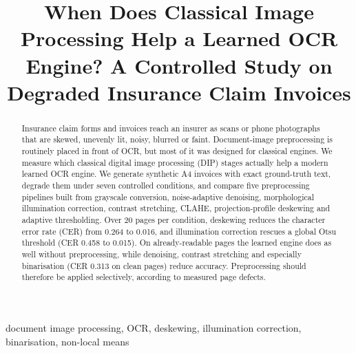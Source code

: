 \documentclass[conference]{IEEEtran}
\begin{document}
\title{When Does Classical Image Processing Help a Learned OCR Engine? A Controlled Study on Degraded Insurance Claim Invoices}

\author{
\and
{}
}

\maketitle

\begin{abstract}
Insurance claim forms and invoices reach an insurer as scans or phone photographs that are skewed, unevenly lit, noisy, blurred or faint. Document-image preprocessing is routinely placed in front of OCR, but most of it was designed for classical engines. We measure which classical digital image processing (DIP) stages actually help a modern learned OCR engine. We generate synthetic A4 invoices with exact ground-truth text, degrade them under seven controlled conditions, and compare five preprocessing pipelines built from grayscale conversion, noise-adaptive denoising, morphological illumination correction, contrast stretching, CLAHE, projection-profile deskewing and adaptive thresholding. Over 20 pages per condition, deskewing reduces the character error rate (CER) from 0.264 to 0.016, and illumination correction rescues a global Otsu threshold (CER 0.458 to 0.015). On already-readable pages the learned engine does as well without preprocessing, while denoising, contrast stretching and especially binarisation (CER 0.313 on clean pages) reduce accuracy. Preprocessing should therefore be applied selectively, according to measured page defects.
\end{abstract}

\begin{IEEEkeywords}
document image processing, OCR, deskewing, illumination correction, binarisation, non-local means
\end{IEEEkeywords}
\end{document}
